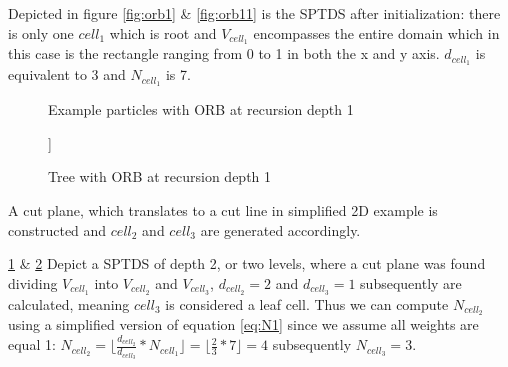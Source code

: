 \documentclass[]{article}
\begin{document}
Depicted in figure \ref{fig:orb1} \&  \ref{fig:orb11} is the SPTDS after initialization: there is only one $cell_1$ which is root and $V_{cell_1}$ encompasses the entire domain which in this case is the rectangle ranging from 0 to 1 in both the x and y axis. $d_{cell_1}$ is equivalent to 3 and $N_{cell_1}$ is 7. 

\begin{figure}[H]
	\begin{center}
	\end{center}
	\caption{Example particles with ORB at recursion depth 1}
	\label{fig:orb2}
\end{figure}

\begin{figure}[H]
	\centering
	\begin{forest}
		[$cell_1$
		[$cell_2$][$cell_3$]  
		]
	\end{forest}    
	\caption{Tree with ORB at recursion depth 1}
	\label{fig:orb22}
\end{figure}
A cut plane, which translates to a cut line in simplified 2D example is constructed and $cell_2$ and $cell_3$ are generated accordingly.

\ref{fig:orb2} \&  \ref{fig:orb22} Depict a SPTDS of depth 2, or two levels, where a cut plane was found dividing $V_{cell_1}$ into $V_{cell_2}$ and $V_{cell_3}$, $d_{cell_2} = 2$ and $d_{cell_3} = 1$ subsequently are calculated, meaning $cell_3$ is considered a leaf cell. Thus we can compute $N_{cell_2}$ using a simplified version of equation \ref{eq:N1} since we assume all weights are equal 1: $N_{cell_2} = \lfloor \frac{d_{cell_2}}{d_{cell_3}} * N_{cell_1} \rfloor = \lfloor \frac{2}{3}  * 7 \rfloor = 4$ subsequently $N_{cell_3} = 3$. 
\end{document}
